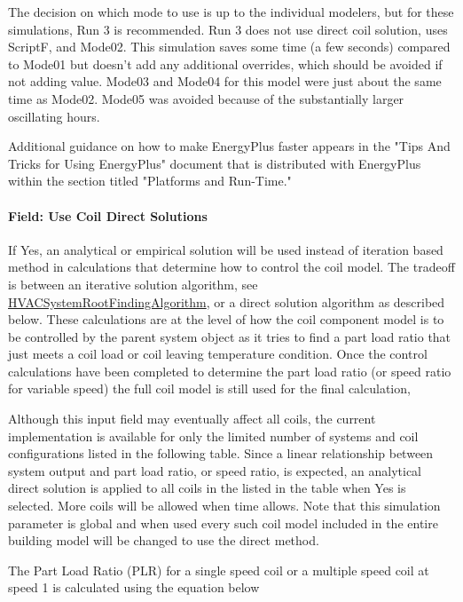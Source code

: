 The decision on which mode to use is up to the individual modelers, but for these simulations, Run 3 is recommended. Run 3 does not use direct coil solution, uses ScriptF, and Mode02. This simulation saves some time (a few seconds) compared to Mode01 but doesn’t add any additional overrides, which should be avoided if not adding value. Mode03 and Mode04 for this model were just about the same time as Mode02.  Mode05 was avoided because of the substantially larger oscillating hours.

Additional guidance on how to make EnergyPlus faster appears in the "Tips And Tricks for Using EnergyPlus" document that is distributed with EnergyPlus within the section titled "Platforms and Run-Time."


\paragraph{Field: Use Coil Direct Solutions}\label{use-coil-direct-solutions}

If Yes, an analytical or empirical solution will be used instead of iteration based method in calculations that determine how to control the coil model.  The tradeoff is between an iterative solution algorithm, see \hyperref[hvacystemrootfindingalgorithm]{HVACSystemRootFindingAlgorithm}, or a direct solution algorithm as described below.  These calculations are at the level of how the coil component model is to be controlled by the parent system object as it tries to find a part load ratio that just meets a coil load or coil leaving temperature condition.  Once the control calculations have been completed to determine the part load ratio (or speed ratio for variable speed) the full coil model is still used for the final calculation,

Although this input field may eventually affect all coils, the current implementation is available for only the limited number of systems and coil configurations listed in the following table. Since a linear relationship between system output and part load ratio, or speed ratio, is expected, an analytical direct solution is applied to all coils in the listed in the table when Yes is selected. More coils will be allowed when time allows. Note that this simulation parameter is global and when used every such coil model included in the entire building model will be changed to use the direct method.

The Part Load Ratio (PLR) for a single speed coil or a multiple speed coil at speed 1 is calculated using the equation below

